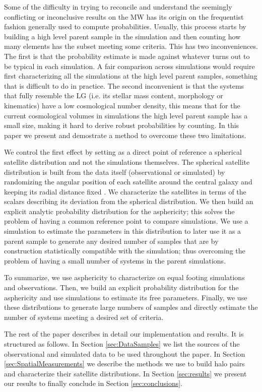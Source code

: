 \documentclass[a4paper,fleqn,usenatbib]{mnras}
\begin{document}
Some of the difficulty in trying to reconcile and understand the
seemingly conflicting or inconclusive results on the MW has its origin on
the frequentist fashion generally used to compute probabilities.
Usually, this process starts by building a high level parent sample in the
simulation and then counting how many elements has the subset
meeting some criteria. 
This has two inconveniences.
The first is that the probability estimate is made against whatever
turns out to be typical in each simulation. 
A fair comparison across simulations would require first
characterizing all the simulations at the high level parent samples,
something that is difficult to do in practice. 
The second inconvenient is that the systems that fully resemble
the LG (i.e. its stellar mass content, morphology or kinematics) have
a low cosmological number density, this means that for the current
cosmological volumes in simulations the high level parent sample has a
small size, making it hard to derive robust probabilities by counting.   
In this paper we present and demostrate a method to overcome these two
limitations.

We control the first effect by setting as a direct point of reference
a spherical satellite distribution and not the simulations themselves.
The spherical satellite distribution is built from the data itself
(observational or simulated) by randomizing the angular position
of each satellite around the central galaxy and keeping its radial
distance fixed \citep{2017AN....338..854P}. 
We characterize the satellites in terms of the scalars describing its
deviation from the spherical distribution. 
We then build an explicit analytic probability distribution for the
asphericity; this solves the problem of having a common reference
point to compare simulations.  
We use a simulation to estimate the parameters in this distribution to
later use it as a parent sample to generate any desired number of
samples that are by construction statistically compatible with the
simulation; thus overcoming the problem of having a small number of
systems in the parent simulations. 

To summarize, we use asphericity to characterize on equal footing
simulations and observations.  
Then, we build an explicit probability distribution for the asphericity and
use simulations to estimate its free parameters.
Finally, we use these distributions to generate large numbers of
samples and directly estimate the number of systems meeting a desired
set of criteria.

The rest of the paper describes in detail our implementation and
results. It is structured as follows. 
In Section \ref{sec:DataSamples} we list the sources of the observational and
simulated data to be used throughout the paper.
In Section \ref{sec:SpatialMeasurements} we describe the methods we
use to build halo pairs and  
characterize their satellite distributions.
In Section \ref{sec:results} we present our results to finally
conclude in Section \ref{sec:conclusions}. 
\end{document}
